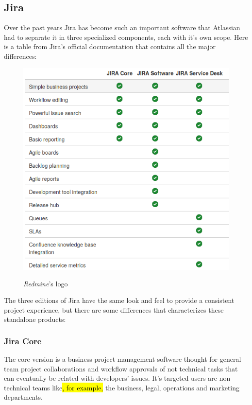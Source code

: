 	\subsection{Jira}
		Over the past years Jira has become such an important software that Atlassian had to separate it in three specialized components, each with it's own scope.
		Here is a table from Jira's official documentation that contains all the major differences:
		\begin{figure}[H]
			\centering
			\includegraphics[width=\textwidth]{resources/jira_type}\\
			\caption{\textit{Redmine}'s logo}
		\end{figure}
		The three editions of Jira have the same look and feel to provide a consistent project experience, but there are some differences that characterizes these standalone products\cite{what-are-the-differences}:
		\subsubsection{Jira Core}
			The core version is a business project management software thought for general team project collaborations and workflow approvals of not technical tasks that can eventually be related with developers' issues.
			It's targeted users are non technical teams like\hl{, for example,} the business, legal, operations and marketing departments.
			

